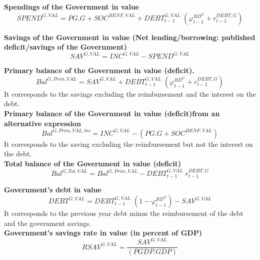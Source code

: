\documentclass[12pt]{article}
\numberwithin{equation}{section}
\begin{document}
\noindent\textbf{Spendings of the Government in value} \\
\begin{dmath}
SPEND^{G,VAL} = PG . G + SOC^{BENF,VAL} + DEBT^{G,VAL}_{t-1} \; \left( \varphi^{RD^{G}}_{t-1} + r^{DEBT,G}_{t-1} \right)
\end{dmath}

\noindent\textbf{Savings of the Government in value (Net lending/borrowing: published deficit/savings of the Government)} \\
\begin{dmath}
SAV^{G,VAL} = INC^{G,VAL} - SPEND^{G,VAL}
\end{dmath}

\noindent\textbf{Primary balance of the Government in value (deficit).} \\
\begin{dmath}
Bal^{G,Prim,VAL} = SAV^{G,VAL} + DEBT^{G,VAL}_{t-1} \; \left( \varphi^{RD^{G}}_{t-1} + r^{DEBT,G}_{t-1} \right)
\end{dmath}
It corresponds to the savings excluding the reimbursement and the interest on the debt. \\

\noindent\textbf{Primary balance of the Government in value (deficit)from an alternative expression} \\
\begin{dmath}
Bal^{G,Prim,VAL,bis} = INC^{G,VAL} - \left( PG . G + SOC^{BENF,VAL} \right)
\end{dmath}
It corresponds to the saving excluding the reimbursement but not the interest on the debt. \\

\noindent\textbf{Total balance of the Government in value (deficit)} \\
\begin{dmath}
Bal^{G,Tot,VAL} = Bal^{G,Prim,VAL} - DEBT^{G,VAL}_{t-1} \; r^{DEBT,G}_{t-1}
\end{dmath}

\noindent\textbf{Government's debt in value} \\
\begin{dmath}
DEBT^{G,VAL} = DEBT^{G,VAL}_{t-1} \; \left( 1 - \varphi^{RD^{G}}_{t-1} \right) - SAV^{G,VAL}
\end{dmath}
It corresponds to the previous year debt minus the reimbursement of the debt and the government savings. \\

\noindent\textbf{Government's savings rate in value (in percent of GDP)} \\
\begin{dmath}
RSAV^{G,VAL} = \frac{SAV^{G,VAL}}{\left( PGDP . GDP \right)}
\end{dmath}
\end{document}
